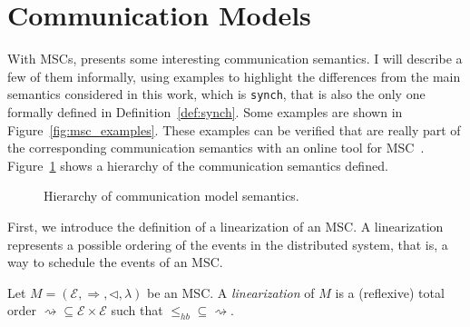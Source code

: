 \section{Communication Models}

With MSCs, \cite{di2023partial} presents some interesting communication
semantics. I will describe a few of them informally, using examples to
highlight the differences from the main semantics considered in this work,
which is \verb|synch|, that is also the only one formally defined in 
Definition~\ref{def:synch}. Some examples are
shown in Figure~\ref{fig:msc_examples}. These examples can be verified that 
are really part of the corresponding communication semantics with an online
tool for MSC~\cite{MSCTool}. Figure~\ref{fig:coms} shows a hierarchy
of the communication semantics defined.

\begin{figure}[!h]
\centering
{}
\caption{Hierarchy of communication model semantics.}
\label{fig:coms}
\end{figure}

First, we introduce the definition of a linearization of an MSC. A
linearization represents a possible ordering of the events in the distributed
system, that is, a way to schedule the events of an MSC.

\begin{definition}
	Let $M = (\mathcal{E}, \Rightarrow, \triangleleft, \lambda)$ be an MSC.
	A \emph{linearization} of $M$ is a (reflexive) total order
	$\rightsquigarrow \subseteq \mathcal{E} \times \mathcal{E}$ such that
	$\leq_{hb} \subseteq \rightsquigarrow$.
\end{definition}


